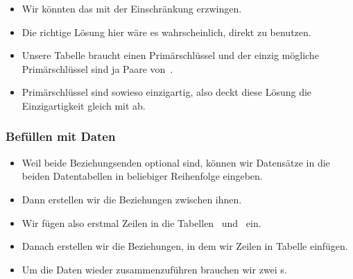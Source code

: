 \begin{frame}
{\begin{itemize}
{}%
%
%
%
%
%
%
%
%
%
\item<19-> Wir könnten das mit der Einschränkung  erzwingen.%
%
\item<20-> Die richtige Lösung hier wäre es wahrscheinlich, direkt  zu benutzen.%
%
\item<21-> Unsere Tabelle braucht einen Primärschlüssel und der einzig mögliche Primärschlüssel sind ja Paare von~.%
%
\item<22-> Primärschlüssel sind sowieso einzigartig, also deckt diese Lösung die Einzigartigkeit gleich mit ab.%
%
\end{itemize}%
}%
%
\end{frame}%
%
\begin{frame}[t]%
\frametitle{Befüllen mit Daten}%
\parbox{0.435\linewidth}{\small%
\begin{itemize}%
\item Weil beide Beziehungsenden optional sind, können wir Datensätze in die beiden Datentabellen in beliebiger Reihenfolge eingeben.%
%
\item<2-> Dann erstellen wir die Beziehungen zwischen ihnen.%
%
\item<3-> Wir fügen also erstmal Zeilen in die Tabellen~ und~ ein.%
%
\item<4-> Danach erstellen wir die Beziehungen, in dem wir Zeilen in Tabelle  einfügen.%
%
\item<5-> Um die Daten wieder zusammenzuführen brauchen wir zwei s.
\end{itemize}%
}%
%
\end{frame}%
